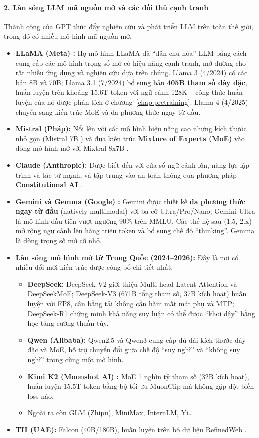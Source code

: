 \paragraph{2. Làn sóng LLM mã nguồn mở và các đối thủ cạnh tranh}
Thành công của GPT thúc đẩy nghiên cứu và phát triển LLM trên toàn thế giới, trong đó có nhiều mô hình mã nguồn mở.
\begin{itemize}
	\item \textbf{LLaMA (Meta) \cite{touvron2023llama, grattafiori2024llama3}:} Họ mô hình LLaMA đã “dân chủ hóa” LLM bằng cách cung cấp các mô hình trọng số mở có hiệu năng cạnh tranh, mở đường cho rất nhiều ứng dụng và nghiên cứu dựa trên chúng. Llama 3 (4/2024) có các bản 8B và 70B; Llama 3.1 (7/2024) bổ sung bản \textbf{405B tham số dày đặc}, huấn luyện trên khoảng 15.6T token với ngữ cảnh 128K -- công thức huấn luyện của nó được phân tích ở chương~\ref{chap:pretraining}. Llama 4 (4/2025) chuyển sang kiến trúc MoE và đa phương thức ngay từ đầu.
	\item \textbf{Mistral (Pháp):} Nổi lên với các mô hình hiệu năng cao nhưng kích thước nhỏ gọn (Mistral 7B \cite{jiang2023mistral}) và đưa kiến trúc \textbf{Mixture of Experts (MoE)} vào dòng mô hình mở với Mixtral 8x7B \cite{jiang2024mixtral}.
	\item \textbf{Claude (Anthropic):} Được biết đến với cửa sổ ngữ cảnh lớn, năng lực lập trình và tác tử mạnh, và tập trung vào an toàn thông qua phương pháp \textbf{Constitutional AI} \cite{bai2022constitutional}.
	\item \textbf{Gemini và Gemma (Google) \cite{geminiteam2023gemini}:} Gemini được thiết kế \textbf{đa phương thức ngay từ đầu} (natively multimodal) với ba cỡ Ultra/Pro/Nano; Gemini Ultra là mô hình đầu tiên vượt ngưỡng 90\% trên MMLU. Các thế hệ sau (1.5, 2.x) mở rộng ngữ cảnh lên hàng triệu token và bổ sung chế độ “thinking”. Gemma là dòng trọng số mở cỡ nhỏ.
	\item \textbf{Làn sóng mô hình mở từ Trung Quốc (2024--2026):} Đây là nơi có nhiều đổi mới kiến trúc được công bố chi tiết nhất:
	\begin{itemize}
		\item \textbf{DeepSeek:} DeepSeek-V2 \cite{deepseekai2024v2} giới thiệu Multi-head Latent Attention và DeepSeekMoE; DeepSeek-V3 \cite{deepseekai2024v3} (671B tổng tham số, 37B kích hoạt) huấn luyện với FP8, cân bằng tải không cần hàm mất mát phụ và MTP; DeepSeek-R1 \cite{deepseekai2025r1} chứng minh khả năng suy luận có thể được “khơi dậy” bằng học tăng cường thuần túy.
		\item \textbf{Qwen (Alibaba):} Qwen2.5 và Qwen3 \cite{yang2025qwen3} cung cấp đủ dải kích thước dày đặc và MoE, hỗ trợ chuyển đổi giữa chế độ “suy nghĩ” và “không suy nghĩ” trong cùng một mô hình.
		\item \textbf{Kimi K2 (Moonshot AI) \cite{kimiteam2025k2}:} MoE 1 nghìn tỷ tham số (32B kích hoạt), huấn luyện 15.5T token bằng bộ tối ưu MuonClip mà không gặp đột biến loss nào.
		\item Ngoài ra còn GLM (Zhipu), MiniMax, InternLM, Yi\ldots
	\end{itemize}
	\item \textbf{TII (UAE):} Falcon (40B/180B), huấn luyện trên bộ dữ liệu RefinedWeb \cite{penedo2023refinedweb}.
\end{itemize}
